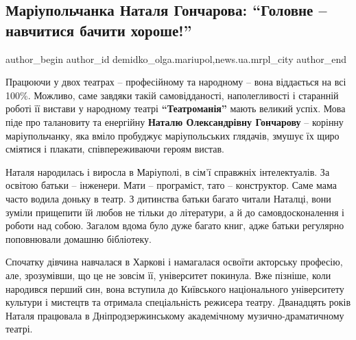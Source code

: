  
 
 
 
 
 
\subsection{Маріупольчанка Наталя Гончарова: \enquote{Головне – навчитися бачити хороше!}}
\label{sec:12_09_2019.stz.news.ua.mrpl_city.1.natalja_goncharova_bachyty_horoshe}
 
\ifcmt
 author_begin
   author_id demidko_olga.mariupol,news.ua.mrpl_city
 author_end
\fi

Працюючи у двох театрах – професійному та народному – вона віддається на всі
100\%. Можливо, саме завдяки такій самовідданості, наполегливості і старанній
роботі її вистави у народному театрі \textbf{\enquote{Театроманія}} мають великий успіх. Мова
піде про талановиту та енергійну \textbf{Наталю Олександрівну Гончарову} – корінну
маріупольчанку, яка вміло пробуджує маріупольських глядачів, змушує їх щиро
сміятися і плакати, співпереживаючи героям вистав.


Наталя народилась і виросла в Маріуполі, в сім'ї справжніх інтелектуалів. За
освітою батьки – інженери. Мати – програміст, тато – конструктор. Саме мама
часто водила доньку в театр. З дитинства батьки багато читали Наталці, вони
зуміли прищепити їй любов не тільки до літератури, а й до самовдосконалення і
роботи над собою. Загалом вдома було дуже багато книг, адже батьки регулярно
поповнювали домашню бібліотеку.

Спочатку дівчина навчалася в Харкові і намагалася освоїти акторську професію,
але, зрозумівши, що це не зовсім її, університет покинула. Вже пізніше, коли
народився перший син, вона вступила до Київського національного університету
культури і мистецтв та отримала спеціальність режисера театру. Дванадцять років
Наталя працювала в Дніпродзержинському академічному музично-драматичному
театрі.


